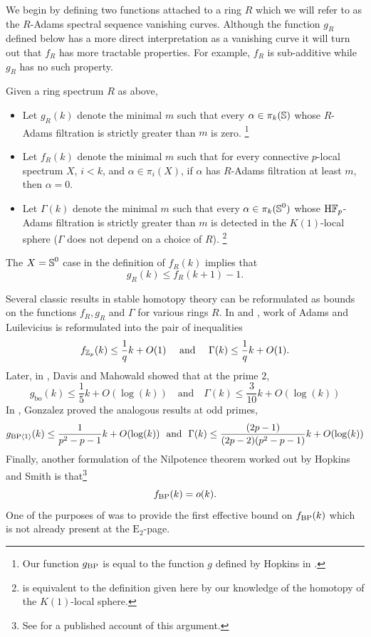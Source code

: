 We begin by defining two functions attached to a ring $R$ which we will refer to as the $R$-Adams spectral sequence vanishing curves. Although the function $g_R$ defined below has a more direct interpretation as a vanishing curve it will turn out that $f_R$ has more tractable properties. For example, $f_R$ is sub-additive while $g_R$ has no such property.

\begin{dfn}
  \label{dfn:exp-of-nilp}
  Given a ring spectrum $R$ as above,
  \begin{itemize}
  \item Let $g_R(k)$ denote the minimal $m$ such that every
    $\alpha \in \pi_k(\operatorname{\mathbb{S}})$ whose $R$-Adams filtration is strictly greater than $m$ is zero. \footnote{Our function $g_{\mathrm{BP}}$ is equal to the function $g$ defined by Hopkins in \cite{''''}.}
  \item Let $f_R(k)$ denote the minimal $m$ such that
    for every connective $p$-local spectrum $X$, $i < k$, and $\alpha \in \pi_i(X)$,
    if $\alpha$ has $R$-Adams filtration at least $m$, then $\alpha = 0$. %
  \item Let $\Gamma (k)$ denote the minimal $m$ such that every $\alpha \in \pi_k(\operatorname{\mathbb{S}}^0)$ whose $\mathrm{H}\mathbb{F}_p$-Adams filtration is strictly greater than $m$ is detected in the $K(1)$-local sphere ($\Gamma$ does not depend on a choice of $R$).
    \footnote{ is equivalent to the definition given here by our knowledge of the homotopy of the $K(1)$-local sphere.}
  \end{itemize}
\end{dfn}

\begin{rmk}\label{rmk:g-f-comp}
  \label{rmk:g->f}
  The $X = \operatorname{\mathbb{S}}^0$ case in the definition of $f_R(k)$ implies that $$g_R(k) \leq f_R(k+1) - 1. $$
\end{rmk}

Several classic results in stable homotopy theory can be reformulated as bounds on the functions $f_R, g_R$ and $\Gamma$ for various rings $R$.
In \cite{MathewExponent} and \cite{Akhil}, work of Adams \cite{AdamsPer} and Luilevicius \cite{liul} is reformulated into the pair of inequalities
$$ f_{\mathbb{Z}_p}(k) \leq \frac{1}{q}k + O(1) \ \ \ \text{ and }\ \ \  \Gamma(k) \leq \frac{1}{q}k + O(1). $$
Later, in \cite{DM3}, Davis and Mahowald showed that at the prime $2$,
$$ g_{\text{bo}}(k) \leq \frac{1}{5}k + O(\log(k)) \ \ \ \text{ and }\ \ \  \Gamma(k) \leq \frac{3}{10}k + O(\log(k)) $$
In \cite{Gonz00}, Gonzalez proved the analogous results at odd primes, 
$$ g_{\mathrm{BP}\langle 1 \rangle}(k) \leq \frac{1}{p^2 - p -1}k + O(\log(k))\  \text{ and }\  \Gamma(k) \leq \frac{(2p-1)}{(2p-2)(p^2 - p -1)}k + O(\log(k)) $$
Finally, another formulation of the Nilpotence theorem \cite{DHS} worked out by Hopkins and Smith is that\footnote{See \cite[Theorem 3.30]{Akhil} for a published account of this argument.}
$$ f_{\mathrm{BP}}(k) = o(k). $$
One of the purposes of  was to provide the first effective bound on $f_{\mathrm{BP}}(k)$ which is not already present at the $\mathrm{E}_2$-page.

